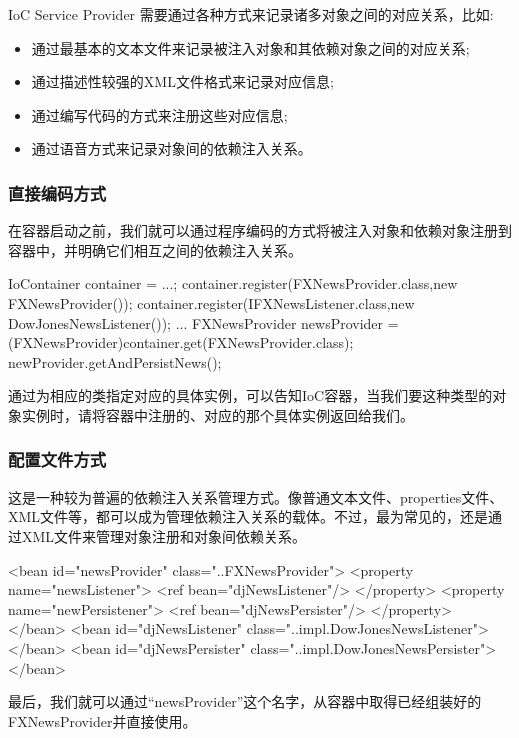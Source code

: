 IoC Service Provider 需要通过各种方式来记录诸多对象之间的对应关系，比如:
\begin{itemize}
    \item 通过最基本的文本文件来记录被注入对象和其依赖对象之间的对应关系;
    \item 通过描述性较强的XML文件格式来记录对应信息;
    \item 通过编写代码的方式来注册这些对应信息;
    \item 通过语音方式来记录对象间的依赖注入关系。
\end{itemize}

\subsubsection*{直接编码方式}

在容器启动之前，我们就可以通过程序编码的方式将被注入对象和依赖对象注册到容器中，并明确它们相互之间的依赖注入关系。

\begin{Java}
IoContainer container = ...; 
container.register(FXNewsProvider.class,new FXNewsProvider()); 
container.register(IFXNewsListener.class,new DowJonesNewsListener()); 
... 
FXNewsProvider newsProvider = (FXNewsProvider)container.get(FXNewsProvider.class); 
newProvider.getAndPersistNews(); 
\end{Java}

通过为相应的类指定对应的具体实例，可以告知IoC容器，当我们要这种类型的对象实例时，请将容器中注册的、对应的那个具体实例返回给我们。

\subsubsection*{配置文件方式}

这是一种较为普遍的依赖注入关系管理方式。像普通文本文件、properties文件、XML文件等，都可以成为管理依赖注入关系的载体。不过，最为常见的，还是通过XML文件来管理对象注册和对象间依赖关系。

\begin{xml}
<bean id="newsProvider" class="..FXNewsProvider">
    <property  name="newsListener">
        <ref  bean="djNewsListener"/>
    </property>
    <property  name="newPersistener">
        <ref  bean="djNewsPersister"/>
    </property>
</bean>
<bean id="djNewsListener"    class="..impl.DowJonesNewsListener">
</bean>
<bean id="djNewsPersister"    class="..impl.DowJonesNewsPersister">
</bean> 
\end{xml}

最后，我们就可以通过“newsProvider”这个名字，从容器中取得已经组装好的FXNewsProvider并直接使用。

